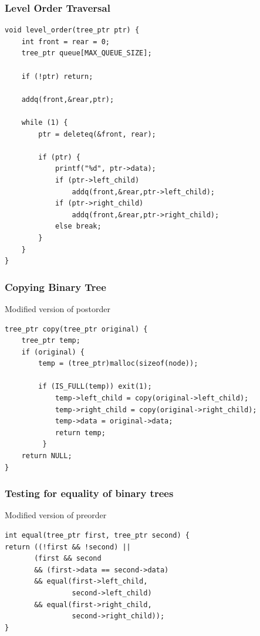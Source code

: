 \documentclass[newPxFont,sthlmFooter,nooffset]{beamer}
\begin{document}
\begin{frame}[t, fragile]
  \frametitle{Level Order Traversal}
  \begin{lstlisting}
void level_order(tree_ptr ptr) { 
    int front = rear = 0;
    tree_ptr queue[MAX_QUEUE_SIZE]; 

    if (!ptr) return; 

    addq(front,&rear,ptr);

    while (1) {
        ptr = deleteq(&front, rear); 

        if (ptr) {
            printf("%d", ptr->data); 
            if (ptr->left_child)
                addq(front,&rear,ptr->left_child); 
            if (ptr->right_child)
                addq(front,&rear,ptr->right_child); 
            else break;
        }
    } 
}    
  \end{lstlisting}
\end{frame}


\begin{frame}[t, fragile]
  \frametitle{Copying Binary Tree}
Modified version of postorder
\begin{lstlisting}
tree_ptr copy(tree_ptr original) {
    tree_ptr temp; 
    if (original) {
        temp = (tree_ptr)malloc(sizeof(node)); 

        if (IS_FULL(temp)) exit(1); 
            temp->left_child = copy(original->left_child); 
            temp->right_child = copy(original->right_child); 
            temp->data = original->data; 
            return temp;
         }
    return NULL; 
}  
\end{lstlisting}
\end{frame}


\begin{frame}[t, fragile]
  \frametitle{Testing for equality of binary trees}
Modified version of preorder
\begin{lstlisting}
int equal(tree_ptr first, tree_ptr second) {
return ((!first && !second) || 
       (first && second 
       && (first->data == second->data) 
       && equal(first->left_child,
                second->left_child) 
       && equal(first->right_child,
                second->right_child));
}
\end{lstlisting}
\end{frame}
\end{document}
